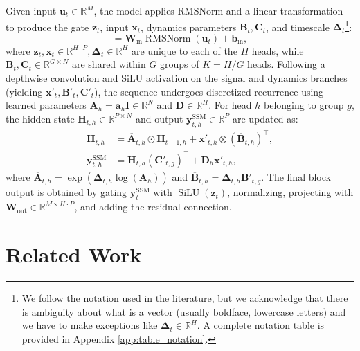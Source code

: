 \documentclass{article}
\theoremstyle{plain}
\theoremstyle{definition}
\theoremstyle{remark}
\begin{document}
Given input $\bm{u}_t \in \mathbb{R}^M$, the model applies RMSNorm and a linear transformation to produce the gate $\bm{z}_t$, input $\bm{x}_t$, dynamics parameters $\bm{B}_t, \bm{C}_t$, and timescale $\bm{\Delta}_t$\footnote{We follow the notation used in the literature, but we acknowledge that there is ambiguity about what is a vector (usually boldface, lowercase letters) and we have to make exceptions like $\bm{\Delta}_t \in \mathbb{R}^H$. A complete notation table is provided in Appendix \ref{app:table_notation}.}:
\begin{equation}
[\bm{z}_t; \bm{x}_t; \bm{B}_t; \bm{C}_t; \bm{\Delta}_t] = \bm{W}_{\text{in}}\operatorname{RMSNorm}(\bm{u}_t) + \bm{b}_{\text{in}}, \label{eq:mamba2_projection}
\end{equation}
where $\bm{z}_t, \bm{x}_t \in \mathbb{R}^{H \cdot P}, \bm{\Delta}_t \in \mathbb{R}^{H}$ are unique to each of the $H$ heads, while $\bm{B}_t, \bm{C}_t \in \mathbb{R}^{G \times N}$ are shared within $G$ groups of $K = H / G$ heads. Following a depthwise convolution and SiLU activation on the signal and dynamics branches (yielding $\bm{x}'_t, \bm{B}'_t, \bm{C}'_t$), the sequence undergoes discretized recurrence using learned parameters $\bm{A}_h = \bm{a}_h \bm{I} \in \mathbb{R}^N$ and $\bm{D} \in \mathbb{R}^{H}$. For head $h$ belonging to group $g$, the hidden state $\bm{H}_{t,h} \in \mathbb{R}^{P \times N}$ and output $\bm{y}^{\text{SSM}}_{t,h} \in \mathbb{R}^P$ are updated as:
\begin{align}
\bm{H}_{t,h} &= \overline{\bm{A}}_{t, h} \odot \bm{H}_{t-1,h} + \bm{x}'_{t,h} \otimes (\overline{\bm{B}}_{t, h})^\top, \label{eq:hidden_update}\\
\bm{y}^{\text{SSM}}_{t,h} &= \bm{H}_{t,h} (\bm{C}'_{t,g})^\top + \bm{D}_h \bm{x}'_{t,h}, \label{eq:output_compute}
\end{align}
where $\overline{\bm{A}}_{t, h} = \exp(\bm{\Delta}_{t,h} \log (\bm{A}_h))$ and $\overline{\bm{B}}_{t, h} = \bm{\Delta}_{t,h} \bm{B}'_{t,g}$. The final block output is obtained by gating $\bm{y}^{\text{SSM}}_t$ with $\operatorname{SiLU} (\bm{z}_t)$, normalizing, projecting with $\bm{W}_{\text{out}} \in \mathbb{R}^{M \times H \cdot P}$, and adding the residual connection.


\section{Related Work}
\label{sec:related_work}
\end{document}
